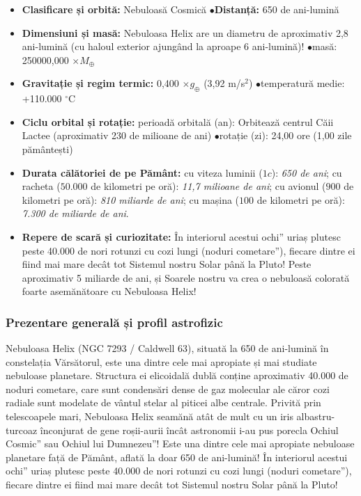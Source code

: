 \begin{tcolorbox}[orbitardata, title={\textbf{Repere esențiale: Nebuloasa Helix (\quotedblbase{}Ochiul lui Dumnezeu\textquotedblright{}, NGC 7293)}}]
\small
\begin{itemize}[leftmargin=1.4em, itemsep=2pt, topsep=2pt]
  \item \textbf{Clasificare și orbită:} Nebuloasă Cosmică \quad$\bullet$\quad \textbf{Distanță:} 650 de ani-lumină
  \item \textbf{Dimensiuni și masă:} Nebuloasa Helix are un diametru de aproximativ 2,8 ani-lumină (cu haloul exterior ajungând la aproape 6 ani-lumină)! \quad$\bullet$\quad masă: 250000,000 $\times M_\oplus$
  \item \textbf{Gravitație și regim termic:} 0,400 $\times g_\oplus$ (3,92 m/s$^2$) \quad$\bullet$\quad temperatură medie: +110.000 $^\circ$C
  \item \textbf{Ciclu orbital și rotație:} perioadă orbitală (an): Orbitează centrul Căii Lactee (aproximativ 230 de milioane de ani) \quad$\bullet$\quad rotație (zi): 24,00 ore (1,00 zile pământești)
  \item \textbf{Durata călătoriei de pe Pământ:} cu viteza luminii ($1c$): \emph{650 de ani}; cu racheta ($50.000$ de kilometri pe oră): \emph{11,7 milioane de ani}; cu avionul ($900$ de kilometri pe oră): \emph{810 miliarde de ani}; cu mașina ($100$ de kilometri pe oră): \emph{7.300 de miliarde de ani}.
  \item \textbf{Repere de scară și curiozitate:} În interiorul acestui \quotedblbase{}ochi\textquotedblright{} uriaș plutesc peste 40.000 de nori rotunzi cu cozi lungi (\quotedblbase{}noduri cometare\textquotedblright{}), fiecare dintre ei fiind mai mare decât tot Sistemul nostru Solar până la Pluto! Peste aproximativ 5 miliarde de ani, și Soarele nostru va crea o nebuloasă colorată foarte asemănătoare cu Nebuloasa Helix!
\end{itemize}
\end{tcolorbox}

\subsubsection*{Prezentare generală și profil astrofizic}
Nebuloasa Helix (NGC 7293 / Caldwell 63), situată la 650 de ani-lumină în constelația Vărsătorul, este una dintre cele mai apropiate și mai studiate nebuloase planetare. Structura ei elicoidală dublă conține aproximativ 40.000 de noduri cometare, care sunt condensări dense de gaz molecular ale căror cozi radiale sunt modelate de vântul stelar al piticei albe centrale. Privită prin telescoapele mari, Nebuloasa Helix seamănă atât de mult cu un iris albastru-turcoaz înconjurat de gene roșii-aurii încât astronomii i-au pus porecla \quotedblbase{}Ochiul Cosmic\textquotedblright{} sau \quotedblbase{}Ochiul lui Dumnezeu\textquotedblright{}! Este una dintre cele mai apropiate nebuloase planetare față de Pământ, aflată la doar 650 de ani-lumină! În interiorul acestui \quotedblbase{}ochi\textquotedblright{} uriaș plutesc peste 40.000 de nori rotunzi cu cozi lungi (\quotedblbase{}noduri cometare\textquotedblright{}), fiecare dintre ei fiind mai mare decât tot Sistemul nostru Solar până la Pluto!

